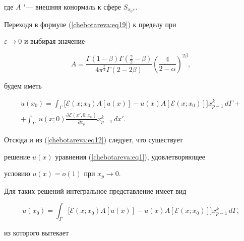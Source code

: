 где $A$ "--- внешняя конормаль к сфере $S_{x_0 \varepsilon}$.





Переходя в формуле (\ref{chebotareva:eq19}) к пределу при


$\varepsilon \to 0$ и выбирая значение


\begin{equation}


\label{chebotareva:eq24} A=\frac{\Gamma (1 - \beta )\Gamma \left(


{\frac{\gamma }{2} - \beta } \right)}{4\pi ^{\frac{\gamma


}{2}}\Gamma \left( {2 - 2\beta } \right)}\left( {\frac{4}{2 -


\alpha }} \right)^{2\beta }, 


\end{equation}


будем иметь


\begin{multline*}


 u(x_0 ) = \int_\Gamma \bigl[ \mathcal{E}(x; x_0 )A[u\left(


x \right)] - u\left( x \right)A[\mathcal{E}(x; x_0 )] \bigr]x_{p -


1}^k \,d\Gamma  + \\+ \int_{\Gamma _1 } u(x; 0)\frac{\partial


\mathcal{E}(x', 0; x_0 )}{\partial x_p }x_{p - 1}^k\, dx'.


\end{multline*}


Отсюда и из (\ref{chebotareva:eq12}) следует,  что существует


решение $u(x)$ уравнения (\ref{chebotareva:eq1}),  удовлетворяющее


условию $u\left( x \right) = o\left( 1 \right)$ при $x_p \to 0$.


Для таких решений интегральное представление имеет вид


\begin{equation}


\label{chebotareva:eq25} u(x_0 ) = \int_\Gamma \bigl[


{\mathcal{E}(x; x_0 )A[u\left( x \right)] - u\left( x


\right)A[\mathcal{E}(x; x_0 )]} \bigr]x_{p - 1}^k \,d\Gamma  ,


\end{equation}


из которого вытекает


